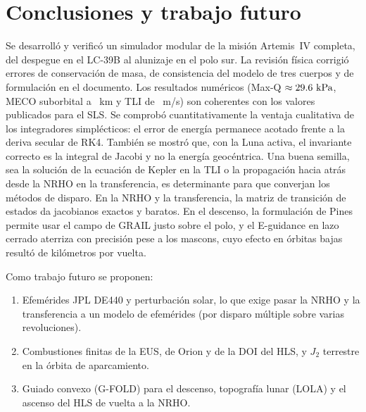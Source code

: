\documentclass[11pt,a4paper]{article}
\begin{document}
\section{Conclusiones y trabajo futuro}\label{sec:futuro}
Se desarrolló y verificó un simulador modular de la misión Artemis~IV completa, del despegue en el LC-39B al alunizaje en el polo sur. La revisión física corrigió errores de conservación de masa, de consistencia del modelo de tres cuerpos y de formulación en el documento. Los resultados numéricos (Max-Q $\approx\RMaxqKpa~\si{kPa}$, MECO suborbital a \RHMecoKm~\si{km} y TLI de \RTliDvMs~\si{m/s}) son coherentes con los valores publicados para el SLS. Se comprobó cuantitativamente la ventaja cualitativa de los integradores simplécticos: el error de energía permanece acotado frente a la deriva secular de RK4. También se mostró que, con la Luna activa, el invariante correcto es la integral de Jacobi y no la energía geocéntrica. Una buena semilla, sea la solución de la ecuación de Kepler en la TLI o la propagación hacia atrás desde la NRHO en la transferencia, es determinante para que converjan los métodos de disparo. En la NRHO y la transferencia, la matriz de transición de estados da jacobianos exactos y baratos. En el descenso, la formulación de Pines permite usar el campo de GRAIL justo sobre el polo, y el E-guidance en lazo cerrado aterriza con precisión pese a los mascons, cuyo efecto en órbitas bajas resultó de kilómetros por vuelta.

Como trabajo futuro se proponen:
\begin{enumerate}
  \item Efemérides JPL DE440 y perturbación solar, lo que exige pasar la NRHO y la transferencia a un modelo de efemérides (por disparo múltiple sobre varias revoluciones).
  \item Combustiones finitas de la EUS, de Orion y de la DOI del HLS, y $J_2$ terrestre en la órbita de aparcamiento.
  \item Guiado convexo (G-FOLD) para el descenso, topografía lunar (LOLA) y el ascenso del HLS de vuelta a la NRHO.
\end{enumerate}
\end{document}
